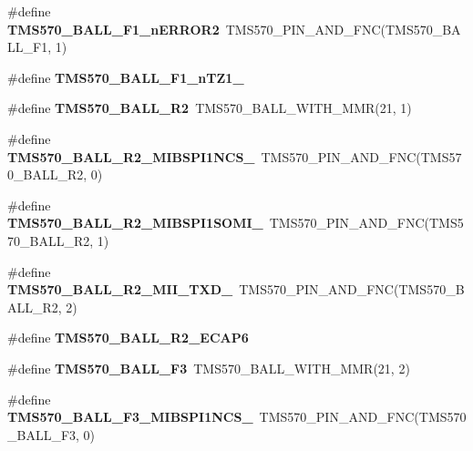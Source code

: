\begin{DoxyCompactItemize}
\#define {\bfseries T\+M\+S570\+\_\+\+B\+A\+L\+L\+\_\+\+F1\+\_\+n\+E\+R\+R\+O\+R2}~T\+M\+S570\+\_\+\+P\+I\+N\+\_\+\+A\+N\+D\+\_\+\+F\+NC(T\+M\+S570\+\_\+\+B\+A\+L\+L\+\_\+\+F1, 1)
\item 
\#define {\bfseries T\+M\+S570\+\_\+\+B\+A\+L\+L\+\_\+\+F1\+\_\+n\+T\+Z1\+\_}
\item 
\mbox{\label{tms570lc4357-pins_8h_a5a9763f993e5d136e0d3e539d5fc38ec}} 
\#define {\bfseries T\+M\+S570\+\_\+\+B\+A\+L\+L\+\_\+\+R2}~T\+M\+S570\+\_\+\+B\+A\+L\+L\+\_\+\+W\+I\+T\+H\+\_\+\+M\+MR(21, 1)
\item 
\mbox{\label{tms570lc4357-pins_8h_ab30a7e0ec74482d0ebb61c82dce0bafa}} 
\#define {\bfseries T\+M\+S570\+\_\+\+B\+A\+L\+L\+\_\+\+R2\+\_\+\+M\+I\+B\+S\+P\+I1\+N\+C\+S\+\_}~T\+M\+S570\+\_\+\+P\+I\+N\+\_\+\+A\+N\+D\+\_\+\+F\+NC(T\+M\+S570\+\_\+\+B\+A\+L\+L\+\_\+\+R2, 0)
\item 
\mbox{\label{tms570lc4357-pins_8h_ac9720ed5bfa58d7fcb5c4ef69f1895c4}} 
\#define {\bfseries T\+M\+S570\+\_\+\+B\+A\+L\+L\+\_\+\+R2\+\_\+\+M\+I\+B\+S\+P\+I1\+S\+O\+M\+I\+\_}~T\+M\+S570\+\_\+\+P\+I\+N\+\_\+\+A\+N\+D\+\_\+\+F\+NC(T\+M\+S570\+\_\+\+B\+A\+L\+L\+\_\+\+R2, 1)
\item 
\mbox{\label{tms570lc4357-pins_8h_a2a6f59fee12e1bd67152c5f7138198d4}} 
\#define {\bfseries T\+M\+S570\+\_\+\+B\+A\+L\+L\+\_\+\+R2\+\_\+\+M\+I\+I\+\_\+\+T\+X\+D\+\_}~T\+M\+S570\+\_\+\+P\+I\+N\+\_\+\+A\+N\+D\+\_\+\+F\+NC(T\+M\+S570\+\_\+\+B\+A\+L\+L\+\_\+\+R2, 2)
\item 
\#define {\bfseries T\+M\+S570\+\_\+\+B\+A\+L\+L\+\_\+\+R2\+\_\+\+E\+C\+A\+P6}
\item 
\mbox{\label{tms570lc4357-pins_8h_a88da99c7d7fb06c76a228bace1ca6ae8}} 
\#define {\bfseries T\+M\+S570\+\_\+\+B\+A\+L\+L\+\_\+\+F3}~T\+M\+S570\+\_\+\+B\+A\+L\+L\+\_\+\+W\+I\+T\+H\+\_\+\+M\+MR(21, 2)
\item 
\mbox{\label{tms570lc4357-pins_8h_a3e0aefbca64e6854a9e279b2c9936e59}} 
\#define {\bfseries T\+M\+S570\+\_\+\+B\+A\+L\+L\+\_\+\+F3\+\_\+\+M\+I\+B\+S\+P\+I1\+N\+C\+S\+\_}~T\+M\+S570\+\_\+\+P\+I\+N\+\_\+\+A\+N\+D\+\_\+\+F\+NC(T\+M\+S570\+\_\+\+B\+A\+L\+L\+\_\+\+F3, 0)
\item 

\end{DoxyCompactItemize}
